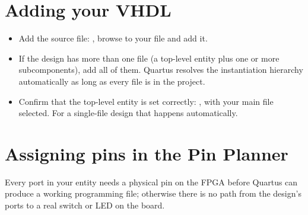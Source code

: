 \section{Adding your VHDL}
\label{app:quartus:sources}

\begin{itemize}
  \item Add the source file: , browse to your
     file and add it.
  \item If the design has more than one file (a top-level entity plus one or more subcomponents), add
    all of them. Quartus resolves the instantiation hierarchy automatically as long as every file is
    in the project.
  \item Confirm that the top-level entity is set correctly: ,
    with your main file selected. For a single-file design that happens automatically.
\end{itemize}

\section{Assigning pins in the Pin Planner}
\label{app:quartus:pins}

Every port in your entity needs a physical pin on the FPGA before Quartus can produce a working
programming file; otherwise there is no path from the design's ports to a real switch or LED on the
board.


